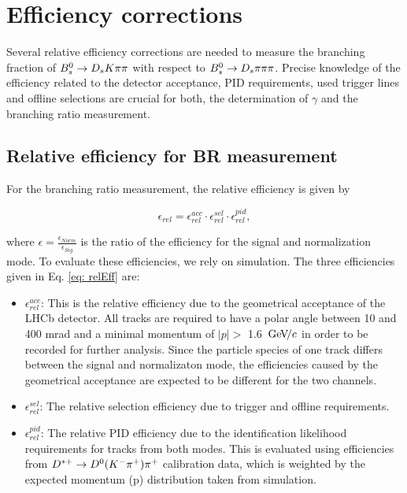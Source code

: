 \section{Efficiency corrections}
\label{sec: efficiency}

Several relative efficiency corrections are needed to measure the branching fraction of ${{B}^0_{s}}\rightarrow{\ensuremath{{D}_{s}}}{\ensuremath{K}}{\ensuremath{\pi}}{\ensuremath{\pi}}$ with respect to ${{B}^0_{s}}\rightarrow{\ensuremath{{D}_{s}}}{\ensuremath{\pi}}{\ensuremath{\pi}}{\ensuremath{\pi}}$. Precise knowledge of the efficiency related to the detector acceptance, PID requirements, used trigger lines and offline selections are crucial for both, the determination of $\gamma$ and the branching ratio measurement.

\subsection{Relative efficiency for BR measurement}
For the branching ratio measurement, the relative efficiency is given by

\begin{equation} 
\epsilon_{rel} = \epsilon^{acc}_{rel}\cdot\epsilon^{sel}_{rel}\cdot\epsilon^{pid}_{rel},
\label{eq: relEff}
\end{equation}

where $\epsilon = \frac{\epsilon_{Norm}}{\epsilon_{Sig}}$ is the ratio of the efficiency for the signal and normalization mode. To evaluate these efficiencies, we rely on simulation. The three efficiencies given in Eq. \ref{eq: relEff} are:

\begin{itemize}

\item $\epsilon^{acc}_{rel}$: This is the relative efficiency due to the geometrical acceptance of the LHCb detector. All tracks are required to have a polar angle between 10 and 400 mrad and a minimal momentum of $|p| >$ 1.6 ${\mathrm{\,Ge\kern -0.1em V\!/}c}$ in order to be recorded for further analysis. Since the particle species of one track differs between the signal and normalizaton mode, the efficiencies caused by the geometrical acceptance are expected to be different for the two channels.

\item $\epsilon^{sel}_{rel}$: The relative selection efficiency due to trigger and offline requirements. 

\item $\epsilon^{pid}_{rel}$: The relative PID efficiency due to the identification likelihood requirements for tracks from both modes. This is evaluated using efficiencies from ${D}^{*+}\rightarrow D^{0}({{K}^-}{{\pi}^+}){{\pi}^+}$ calibration data, 
which is weighted by the expected momentum (p) distribution taken from simulation.

\end{itemize}

